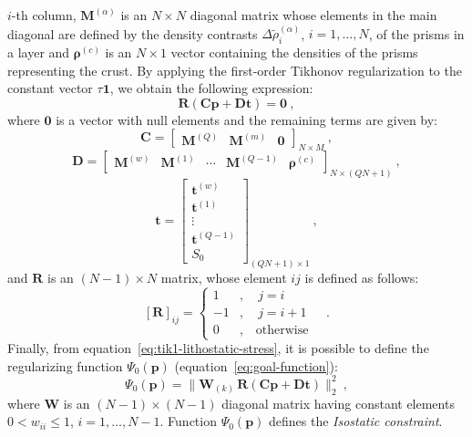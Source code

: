 \documentclass[manuscript]{geophysics}
\begin{document}
$i$-th column, $\mathbf{M}^{(\alpha)}$ is an $N \times N$ diagonal matrix whose  
elements in the main diagonal are defined by the density contrasts 
$\Delta \tilde{\rho}^{(\alpha)}_{i}$, $i = 1, \dots, N$, of the prisms in a layer and
$\boldsymbol{\rho}^{(c)}$ is an $N \times 1$ vector containing the densities of the prisms
representing the crust. By applying the first-order Tikhonov regularization
\citep{aster-etal2005} to the constant vector $\tau \mathbf{1}$, we obtain the
following expression:
\begin{equation}
\mathbf{R} \left( \mathbf{C} \mathbf{p} + \mathbf{D} \mathbf{t} \right) = \mathbf{0} 
\: ,
\label{eq:tik1-lithostatic-stress}
\end{equation}
where $\mathbf{0}$ is a vector with null elements and the remaining terms are given by:
\begin{equation}
\mathbf{C} = \begin{bmatrix}
\mathbf{M}^{(Q)} & \mathbf{M}^{(m)} & \mathbf{0}
\end{bmatrix}_{N \times M} \: ,
\label{eq:matrix-C}
\end{equation}
\begin{equation}
\mathbf{D} = \begin{bmatrix}
\mathbf{M}^{(w)} & \mathbf{M}^{(1)} & \cdots & \mathbf{M}^{(Q-1)} &
\boldsymbol{\rho}^{(c)}
\end{bmatrix}_{N \times \left( QN + 1 \right)} \: ,
\label{eq:matrix-D}
\end{equation}
\begin{equation}
\mathbf{t} = \begin{bmatrix}
\mathbf{t}^{(w)} \\ \mathbf{t}^{(1)} \\ \vdots \\ \mathbf{t}^{(Q-1)} \\ S_{0}
\end{bmatrix}_{\left( QN + 1 \right) \times 1}\: ,
\label{eq:vector-t}
\end{equation}
and $\mathbf{R}$ is an $\left( N-1 \right) \times N$ matrix, whose element 
$ij$ is defined as follows:
\begin{equation}
\left[ \mathbf{R} \right]_{ij} = \begin{cases}
1 &, \quad j = i \\
-1 &, \quad j = i + 1 \\
0 &, \quad \text{otherwise}
\end{cases} \quad .
\label{eq:matrix-R}
\end{equation}
Finally, from equation~\ref{eq:tik1-lithostatic-stress}, it is possible to
define the regularizing function $\Psi_{0}(\mathbf{p})$ 
(equation~\ref{eq:goal-function}): 
\begin{equation}
\Psi_{0}(\mathbf{p}) = \| \mathbf{W}_{(k)} \, \mathbf{R} \left( \mathbf{C} \mathbf{p} + \mathbf{D}
\mathbf{t} \right) \|_{2}^{2} \: ,
\label{eq:isostatic-constraint-function}
\end{equation}
where $\mathbf{W}$ is an $(N - 1) \times (N - 1)$ diagonal matrix having constant
elements $0 < w_{ii} \le 1$, $i = 1, \dots, N - 1$. 
Function $\Psi_{0}(\mathbf{p})$ defines the \textit{Isostatic constraint}.
\end{document}
